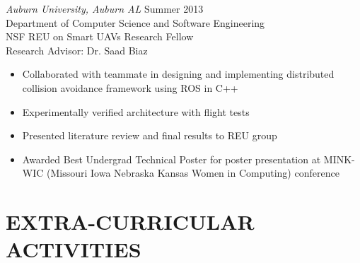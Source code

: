 \documentclass[line,margin]{res}
\begin{document}
\begin{resume}
		{\sl Auburn University, Auburn AL}  \hfill  Summer 2013\\
		Department of Computer Science and Software Engineering  \\
		NSF REU on Smart UAVs Research Fellow \\
		Research Advisor: Dr. Saad Biaz
                 \begin{itemize}[leftmargin=5mm]  \itemsep -2pt %
		 \item Collaborated with teammate in designing and implementing distributed collision avoidance framework using ROS in C++ 
		 \item Experimentally verified architecture with flight tests 
		 \item Presented literature review and final results to REU group
		 \item Awarded Best Undergrad Technical Poster for poster presentation at MINK-WIC (Missouri Iowa Nebraska Kansas Women in Computing) conference
                 \end{itemize} 
\section{EXTRA-CURRICULAR \\ ACTIVITIES}             
	
%
%	
%		


		

\end{resume}
\end{document}
